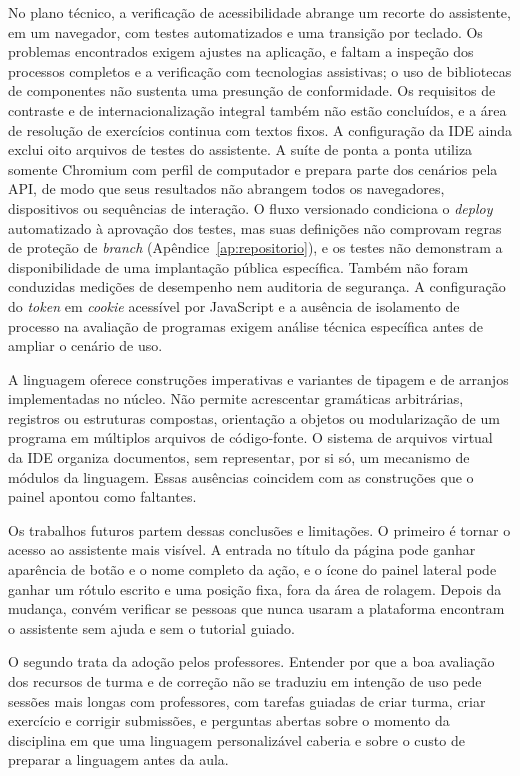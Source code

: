 No plano técnico, a verificação de acessibilidade abrange um recorte do assistente, em um navegador, com testes automatizados e uma transição por teclado. Os problemas encontrados exigem ajustes na aplicação, e faltam a inspeção dos processos completos e a verificação com tecnologias assistivas; o uso de bibliotecas de componentes não sustenta uma presunção de conformidade. Os requisitos de contraste e de internacionalização integral também não estão concluídos, e a área de resolução de exercícios continua com textos fixos. A configuração da IDE ainda exclui oito arquivos de testes do assistente. A suíte de ponta a ponta utiliza somente Chromium com perfil de computador e prepara parte dos cenários pela API, de modo que seus resultados não abrangem todos os navegadores, dispositivos ou sequências de interação. O fluxo versionado condiciona o \textit{deploy} automatizado à aprovação dos testes, mas suas definições não comprovam regras de proteção de \textit{branch} (Apêndice~\ref{ap:repositorio}), e os testes não demonstram a disponibilidade de uma implantação pública específica. Também não foram conduzidas medições de desempenho nem auditoria de segurança. A configuração do \textit{token} em \textit{cookie} acessível por JavaScript e a ausência de isolamento de processo na avaliação de programas exigem análise técnica específica antes de ampliar o cenário de uso.

A linguagem oferece construções imperativas e variantes de tipagem e de arranjos implementadas no núcleo. Não permite acrescentar gramáticas arbitrárias, registros ou estruturas compostas, orientação a objetos ou modularização de um programa em múltiplos arquivos de código-fonte. O sistema de arquivos virtual da IDE organiza documentos, sem representar, por si só, um mecanismo de módulos da linguagem. Essas ausências coincidem com as construções que o painel apontou como faltantes.

Os trabalhos futuros partem dessas conclusões e limitações. O primeiro é tornar o acesso ao assistente mais visível. A entrada no título da página pode ganhar aparência de botão e o nome completo da ação, e o ícone do painel lateral pode ganhar um rótulo escrito e uma posição fixa, fora da área de rolagem. Depois da mudança, convém verificar se pessoas que nunca usaram a plataforma encontram o assistente sem ajuda e sem o tutorial guiado.

O segundo trata da adoção pelos professores. Entender por que a boa avaliação dos recursos de turma e de correção não se traduziu em intenção de uso pede sessões mais longas com professores, com tarefas guiadas de criar turma, criar exercício e corrigir submissões, e perguntas abertas sobre o momento da disciplina em que uma linguagem personalizável caberia e sobre o custo de preparar a linguagem antes da aula.

